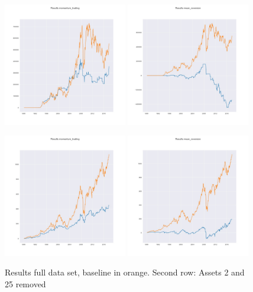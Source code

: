 \begin{figure}[h!]
    \centering
    \includegraphics[width=0.48\textwidth]{../results/results_full_ts/momentum_trading_results.jpg}
    \includegraphics[width=0.48\textwidth]{../results/results_full_ts/mean_reversion_results.jpg}

    \includegraphics[width=0.48\textwidth]{../results/results_full_ts/outlier_removed_momentum_trading_results.jpg}
    \includegraphics[width=0.48\textwidth]{../results/results_full_ts/outlier_removed_mean_reversion_results.jpg}

    \caption{Results full data set, baseline in orange. Second row: Assets 2 and 25 removed}
    \label{4}
  
\end{figure}{}


